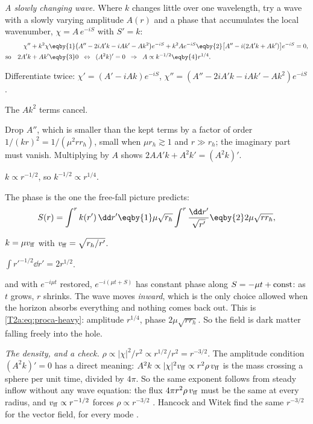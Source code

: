 \emph{A slowly changing wave.} Where $k$ changes little over one wavelength, try a wave with a slowly varying amplitude $A(r)$ and a phase that accumulates the local wavenumber, $\chi=A\,e^{-iS}$ with $S'=k$:
\begin{align*}
  \chi''+k^2\chi
  &\eqby{1}\big(A''-2iA'k-iAk'-Ak^2\big)e^{-iS}+k^2Ae^{-iS}
  \eqby{2}\big[A''-i(2A'k+Ak')\big]e^{-iS}=0,\\
  \text{so}\quad 2A'k+Ak'&\eqby{3}0
  \;\;\Leftrightarrow\;\; (A^2k)'=0
  \;\;\Rightarrow\;\; A\propto k^{-1/2}\eqby{4}r^{1/4}.
\end{align*}
\begin{explain}
  \item Differentiate twice: $\chi'=(A'-iAk)e^{-iS}$, $\chi''=(A''-2iA'k-iAk'-Ak^2)e^{-iS}$.
  \item The $Ak^2$ terms cancel.
  \item Drop $A''$, which is smaller than the kept terms by a factor of order $1/(kr)^2=1/(\mu^2rr_h)$, small when $\mu r_h\gtrsim1$ and $r\gg r_h$; the imaginary part must vanish. Multiplying by $A$ shows $2AA'k+A^2k'=(A^2k)'$.
  \item $k\propto r^{-1/2}$, so $k^{-1/2}\propto r^{1/4}$.
\end{explain}
The phase is the one the free-fall picture predicts:
\begin{align*}
  S(r)=\int^r k(r')\,\dd r'
  \eqby{1}\mu\sqrt{r_h}\int^r\frac{\dd r'}{\sqrt{r'}}
  \eqby{2}2\mu\sqrt{rr_h},
\end{align*}
\begin{explain}
  \item $k=\mu v_{\rm ff}$ with $v_{\rm ff}=\sqrt{r_h/r'}$.
  \item $\int r'^{-1/2}\dd r'=2r^{1/2}$.
\end{explain}
and with $e^{-i\mu t}$ restored, $e^{-i(\mu t+S)}$ has constant phase along $S=-\mu t+{\rm const}$: as $t$ grows, $r$ shrinks. The wave moves \emph{inward}, which is the only choice allowed when the horizon absorbs everything and nothing comes back out. This is \eqref{T2a:eq:proca-heavy}: amplitude $r^{1/4}$, phase $2\mu\sqrt{rr_h}$. So the field is dark matter falling freely into the hole.

\emph{The density, and a check.} $\rho\propto\lvert\chi\rvert^2/r^2\propto r^{1/2}/r^2=r^{-3/2}$. The amplitude condition $(A^2k)'=0$ has a direct meaning: $A^2k\propto\lvert\chi\rvert^2v_{\rm ff}\propto r^2\rho\,v_{\rm ff}$ is the mass crossing a sphere per unit time, divided by $4\pi$. So the same exponent follows from steady inflow without any wave equation: the flux $4\pi r^2\rho\,v_{\rm ff}$ must be the same at every radius, and $v_{\rm ff}\propto r^{-1/2}$ forces $\rho\propto r^{-3/2}$ \cite[Sec.~4]{HuiKabat2019}. Hancock and Witek find the same $r^{-3/2}$ for the vector field, for every mode \cite[Sec.~VI A]{HancockWitek2025}.

